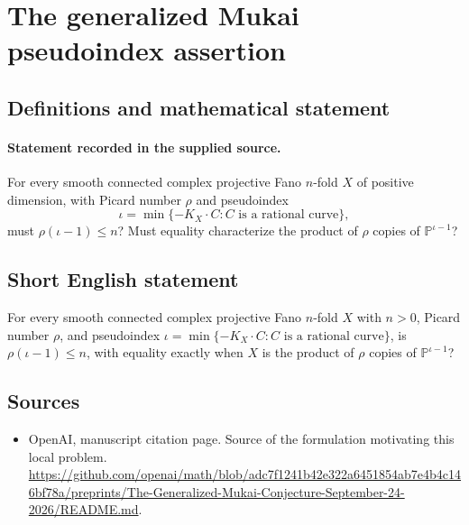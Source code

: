 \documentclass[11pt]{article}
\begin{document}
\section*{The generalized Mukai pseudoindex assertion}\label{30007030}
\subsection{Definitions and mathematical statement}
\paragraph{Statement recorded in the supplied source.}
For every smooth connected complex projective Fano $n$-fold $X$ of positive dimension, with Picard number $\rho$ and pseudoindex
\[
\iota=\min\{-K_X\cdot C: C\text{ is a rational curve}\},
\]
must $\rho(\iota-1)\leq n$? Must equality characterize the product of $\rho$ copies of $\mathbb{P}^{\iota-1}$?
\subsection{Short English statement}
For every smooth connected complex projective Fano $n$-fold $X$ with $n>0$, Picard number $\rho$, and pseudoindex $\iota=\min\{-K_X\cdot C:C\text{ is a rational curve}\}$, is $\rho(\iota-1)\leq n$, with equality exactly when $X$ is the product of $\rho$ copies of $\mathbb{P}^{\iota-1}$?
\subsection{Sources}
\begin{itemize}
\item[S1] OpenAI, manuscript citation page. Source of the formulation motivating this local problem.
\url{https://github.com/openai/math/blob/adc7f1241b42e322a6451854ab7e4b4c146bf78a/preprints/The-Generalized-Mukai-Conjecture-September-24-2026/README.md}.
\end{itemize}
\end{document}
